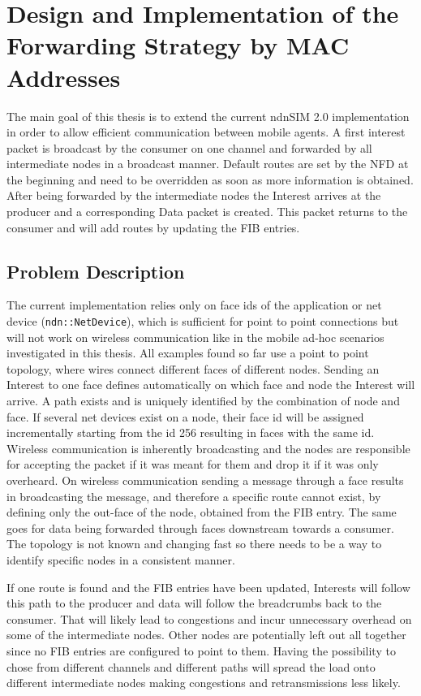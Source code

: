 \chapter{Design and Implementation of the Forwarding Strategy by MAC Addresses}

The main goal of this thesis is to extend the current ndnSIM 2.0 implementation in order to allow efficient communication between mobile agents. A first interest packet is broadcast by the consumer on one channel and forwarded by all intermediate nodes in a broadcast manner. Default routes are set by the NFD at the beginning and need to be overridden as soon as more information is obtained. After being forwarded by the intermediate nodes the Interest arrives at the producer and a corresponding Data packet is created. This packet returns to the consumer and will add routes by updating the FIB entries.

\section{Problem Description}

The current implementation relies only on face ids of the application or net device (\texttt{ndn::NetDevice}), which is sufficient for point to point connections but will not work on wireless communication like in the mobile ad-hoc scenarios investigated in this thesis. All examples found so far use a point to point topology, where wires connect different faces of different nodes. Sending an Interest to one face defines automatically on which face and node the Interest will arrive. A path exists and is uniquely identified by the combination of node and face. If several net devices exist on a node, their face id will be assigned incrementally starting from the id 256 resulting in faces with the same id. Wireless communication is inherently broadcasting and the nodes are responsible for accepting the packet if it was meant for them and drop it if it was only overheard. On wireless communication sending a message through a face results in broadcasting the message, and therefore a specific route cannot exist, by defining only the out-face of the node, obtained from the FIB entry. The same goes for data being forwarded through faces downstream towards a consumer. The topology is not known and changing fast so there needs to be a way to identify specific nodes in a consistent manner.

If one route is found and the FIB entries have been updated, Interests will follow this path to the producer and data will follow the breadcrumbs back to the consumer. That will likely lead to congestions and incur unnecessary overhead on some of the intermediate nodes. Other nodes are potentially left out all together since no FIB entries are configured to point to them. Having the possibility to chose from different channels and different paths will spread the load onto different intermediate nodes making congestions and retransmissions less likely.

